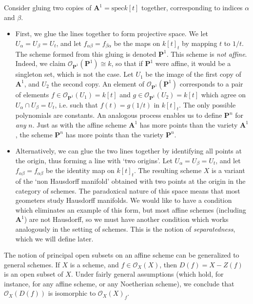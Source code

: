 \begin{example}
    Consider gluing two copies of $\mathbf{A}^1 = \text{spec} k[t]$ together, corresponding to indices $\alpha$ and $\beta$.
    \begin{itemize}
        \item First, we glue the lines together to form projective space. We let $U_\alpha = U_\beta = U_t$, and let $f_{\alpha \beta} = f_{\beta \alpha}$ be the maps on $k[t]_t$ by mapping $t$ to $1/t$. The scheme formed from this gluing is denoted $\mathbf{P}^1$. This scheme is \emph{not affine}. Indeed, we claim $\mathcal{O}_{\mathbf{P}^1}(\mathbf{P}^1) \cong k$, so that if $\mathbf{P}^1$ were affine, it would be a singleton set, which is not the case. Let $U_1$ be the image of the first copy of $\mathbf{A}^1$, and $U_2$ the second copy. An element of $\mathcal{O}_{\mathbf{P}^1}(\mathbf{P}^1)$ corresponds to a pair of elements $f \in \mathcal{O}_{\mathbf{P}^1}(U_1) = k[t]$ and $g \in \mathcal{O}_{\mathbf{P}^1}(U_2) = k[t]$ which agree on $U_\alpha \cap U_\beta = U_t$, i.e. such that $f(t) = g(1/t)$ in $k[t]_t$. The only possible polynomials are constants. An analogous process enables us to define $\mathbf{P}^n$ for \emph{any} $n$. Just as with the affine scheme $\mathbf{A}^1$ has more points than the variety $\mathbf{A}^1$, the scheme $\mathbf{P}^n$ has more points than the variety $\mathbf{P}^n$.

        \item Alternatively, we can glue the two lines together by identifying all points at the origin, thus forming a line with `two origins'. Let $U_\alpha = U_\beta = U_t$, and let $f_{\alpha \beta} = f_{\alpha \beta}$ be the identity map on $k[t]_t$. The resulting scheme $X$ is a variant of the `non Hausdorff manifold' obtained with two points at the origin in the category of schemes. The paradoxical nature of this space means that most geometers study Hausdorff manifolds. We would like to have a condition which eliminates an example of this form, but most affine schemes (including $\mathbf{A}^1$) are not Hausdorff, so we must have another condition which works analogously in the setting of schemes. This is the notion of \emph{separatedness}, which we will define later.
    \end{itemize}
\end{example}

The notion of principal open subsets on an affine scheme can be generalized to general schemes. If $X$ is a scheme, and $f \in \mathcal{O}_X(X)$, then $D(f) = X - Z(f)$ is an open subset of $X$. Under fairly general assumptions (which hold, for instance, for any affine scheme, or any Noetherian scheme), we conclude that $\mathcal{O}_X(D(f))$ is isomorphic to $\mathcal{O}_X(X)_f$.

